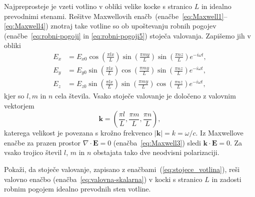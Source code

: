 Najpreprosteje je vzeti votlino v obliki velike kocke s stranico
$L$ in idealno prevodnimi stenami. Rešitve Maxwellovih enačb~(enačbe~\ref{eq:Maxwell1}--\ref{eq:Maxwell4}) 
znotraj take votline so ob upoštevanju robnih pogojev 
(enačbe~\ref{eq:robni-pogoji} in \ref{eq:robni-pogoji5}) 
stoječa valovanja. Zapišemo jih v obliki
\begin{align}
E_{x} & =  E_{x0}\cos\left(\frac{\pi lx}{L}\right)\sin\left(\frac{\pi my}{L}\right)\sin\left(\frac{\pi nz}{L}\right)e^{-i\omega t},\nonumber \\
E_{y} & =  E_{y0}\sin\left(\frac{\pi lx}{L}\right)\cos\left(\frac{\pi my}{L}\right)\sin\left(\frac{\pi nz}{L}\right)e^{-i\omega t},\nonumber \\
E_{z} & =  E_{z0}\sin\left(\frac{\pi lx}{L}\right)\sin\left(\frac{\pi my}{L}\right)\cos\left(\frac{\pi nz}{L}\right)e^{-i\omega t},
\label{eq:stojece_votlina}
\end{align}
kjer so $l,m$ in $n$ cela števila. Vsako stoječe valovanje je določeno z valovnim 
vektorjem
\begin{equation}
\mathbf{k}=\left(\frac{\pi l}{L},\frac{\pi m}{L},\frac{\pi n}{L}\right),
\end{equation} 
katerega velikost je povezana s krožno frekvenco $|\mathbf{k}|= k = \omega/c$.
Iz Maxwellove enačbe za prazen prostor $\nabla\cdot\mathbf{E}=0$ (enačba~\ref{eq:Maxwell3})
sledi $\mathbf{k}\cdot\mathbf{E}=0$. 
Za vsako trojico števil $l$, $m$ in $n$ obstajata tako dve
neodvisni polarizaciji.

\begin{naloga}
 Pokaži, da stoječe valovanje, zapisano z enačbami~(\ref{eq:stojece_votlina}), reši 
 valovno enačbo (enačba~\ref{eq:valovna-skalarna}) v 
 kocki s stranico $L$ in zadosti robnim pogojem idealno prevodnih sten votline.
\end{naloga}

